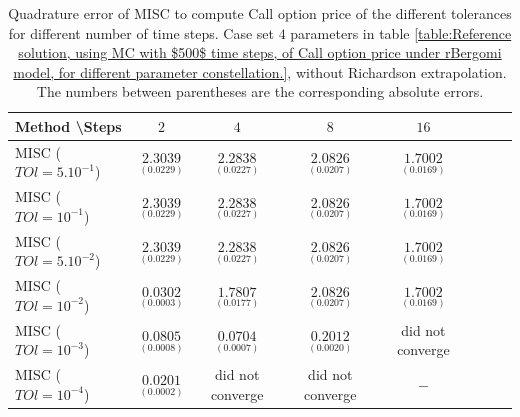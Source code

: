 \documentclass[11pt]{article}
\begin{document}
\begin{table}[h!]
	\centering
	\begin{tabular}{l*{6}{c}r}
		Method \textbackslash  Steps            & $2$ & $4$ & $8$ & $16$  \\
		\hline
		MISC ($TOl=5.10^{-1}$)  & $\underset{ (0.0229) }{\mathbf{  2.3039}}$ & $\underset{(0.0227)}{\mathbf{  2.2838}}$ & $\underset{(  0.0207)}{\mathbf{ 2.0826}}$ & $\underset{(   0.0169)}{\mathbf{ 1.7002}}$   \\
		MISC ($TOl=10^{-1}$)  & $\underset{ (0.0229) }{\mathbf{  2.3039}}$ & $\underset{( 0.0227)}{\mathbf{  2.2838}}$ & $\underset{(  0.0207)}{\mathbf{ 2.0826}}$ & $\underset{(   0.0169)}{\mathbf{ 1.7002}}$  \\
		MISC ($TOl=5.10^{-2}$)  &$\underset{ (0.0229) }{\mathbf{  2.3039}}$ & $\underset{( 0.0227)}{\mathbf{  2.2838}}$ & $\underset{(  0.0207)}{\mathbf{ 2.0826}}$ & $\underset{(   0.0169)}{\mathbf{ 1.7002}}$   \\
		MISC ($TOl=10^{-2}$)  & $\underset{(0.0003)}{\mathbf{
				0.0302}}$ & $\underset{( 0.0177)}{\mathbf{1.7807
		}}$ & $\underset{(  0.0207)}{\mathbf{ 2.0826}}$ & $\underset{(   0.0169)}{\mathbf{ 1.7002}}$  \\
		MISC ($TOl=10^{-3}$)  & $\underset{(0.0008)}{\mathbf{    0.0805}}$ & $\underset{( 0.0007)}{\mathbf{0.0704
		}}$ & $\underset{( 0.0020)}{\mathbf{ 0.2012
		}}$ & did not converge  \\
		MISC ($TOl=10^{-4}$)  & $\underset{(0.0002)}{\mathbf{   0.0201}}$ & did not converge & did not converge & $-$  \\
		\hline
	\end{tabular}
	\caption{Quadrature error of MISC to compute Call option price of the different tolerances for different number of time steps. Case  set $4$ parameters in table \ref{table:Reference solution, using MC with $500$ time steps, of Call option price under rBergomi model, for different parameter constellation.}, without Richardson extrapolation. The numbers between parentheses are the corresponding absolute errors.}
	\label{Quadrature error of MISC to compute Call option price of the different tolerances for different number of time steps. Case  set $4$ parameters, without Richardson extrapolation. The numbers between parentheses are the corresponding absolute errors.}
\end{table}
\end{document}
